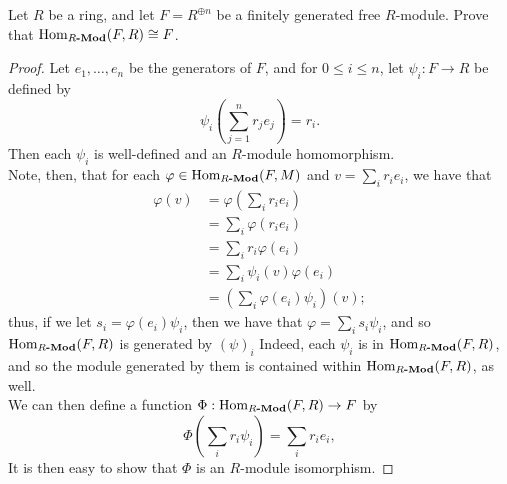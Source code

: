 \documentclass[12pt]{article}
\newenvironment{problem}[2][Problem]{\begin{trivlist}
\item[\hskip \labelsep {\bfseries #1}\hskip \labelsep {\bfseries #2.}]}{\end{trivlist}}
\newcommand{\catname}[1]{\normalfont\textbf{#1}}
\newcommand{\Hom}{\text{Hom}}
\newcommand{\Homod}[2]{\Hom_{#1\catname{-Mod}}(#2)}
\theoremstyle{remark}
\begin{document}
\newpage

\begin{problem}{6.6}
  Let $R$ be a ring, and let $F=R^{\oplus n}$ be a finitely generated
  free $R$-module.
  Prove that $\Homod{R}{F,R}\cong F$.
\end{problem}
\begin{proof}
  Let $e_1,\dots,e_n$ be the generators of $F$, and
  for $0\leq i\leq n$, let $\psi_i:F\to R$ be defined by\\
  \begin{equation*}
    \psi_i\left( \sum_{j=1}^{n} r_je_j \right)
    = r_i.
  \end{equation*}
  Then each $\psi_i$ is well-defined and an $R$-module homomorphism.\\
  \indent Note, then, that for each $\varphi\in\Homod{R}{F,M}$
  and $v=\sum_i r_ie_i$, we have that
  \begin{align*}
    \varphi(v) &= \varphi\left( \sum_i r_ie_i \right) \\ 
    &= \sum_i \varphi(r_ie_i) \\
    &= \sum_i r_i\varphi(e_i) \\
    &= \sum_i \psi_i(v)\varphi(e_i) \\
    &= \left( \sum_i\varphi(e_i)\psi_i \right)(v);
  \end{align*}
  thus, if we let $s_i = \varphi(e_i)\psi_i$, then we have that
  $\varphi=\sum_i s_i\psi_i$,
  and so $\Homod{R}{F,R}$ is generated by $(\psi)_i$
  Indeed, each $\psi_i$ is in $\Homod{R}{F,R}$, and so 
  the module generated by them is contained within $\Homod{R}{F,R}$, as well.
  \\
  \indent We can then define a function $\Phi:\Homod{R}{F,R}\to F$ by
  \begin{equation}
    \Phi\left( \sum_i r_i\psi_i \right) = \sum_i r_ie_i,
  \end{equation}
  It is then easy to show that $\Phi$ is an $R$-module isomorphism.
\end{proof}
\end{document}
